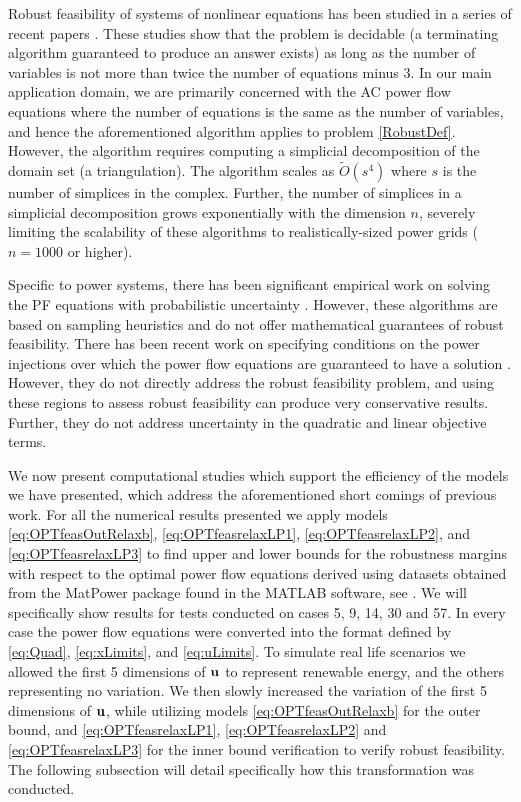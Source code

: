 
Robust feasibility of systems of nonlinear equations has been studied in a series of recent papers \cite{FrKr2015,FrKrWa2016}.
These studies show that the problem is decidable (a terminating algorithm guaranteed to produce an answer exists) as long as the number of variables is not more than twice the number of equations minus $3$.
In our main application domain, we are primarily concerned with the AC power flow equations
where the number of equations is the same as the number of variables, and hence the aforementioned algorithm \cite{FrKr2015,FrKrWa2016} applies to problem \ref{RobustDef}.
However, the algorithm requires computing a simplicial decomposition of the domain set (a triangulation).
The algorithm scales as $\tilde{O}(s^4)$ where $s$ is the number of simplices in the complex.
Further, the number of simplices in a simplicial decomposition grows exponentially with the dimension $n$, severely limiting the scalability of these algorithms to realistically-sized power grids ($n=1000$ or higher).

Specific to power systems, there has been significant empirical work on solving the PF equations with probabilistic uncertainty \cite{morales2007point,wang1992interval}.
However, these algorithms are based on sampling heuristics and do not offer mathematical guarantees of robust feasibility.
There has been recent work on specifying conditions on the power injections over which the power flow equations are guaranteed to have a solution \cite{bolognani2016existence,EPFLA,EPFLB}.
However, they do not directly address the robust feasibility problem, and using these regions to assess robust feasibility can produce very conservative results.
Further, they do not address uncertainty in the quadratic and linear objective terms.

We now present computational studies which support the efficiency of the models we have presented, which address the aforementioned short comings of previous work. 
For all the numerical results presented we apply models \eqref{eq:OPTfeasOutRelaxb}, \eqref{eq:OPTfeasrelaxLP1}, \eqref{eq:OPTfeasrelaxLP2}, and \eqref{eq:OPTfeasrelaxLP3} to find upper and lower bounds for the robustness margins with respect to the optimal power flow equations derived using datasets obtained from the MatPower package found in the MATLAB software, see \cite{matpower}. 
We will specifically show results for tests conducted on cases 5, 9, 14, 30 and 57. 
In every case the power flow equations were converted into the format defined by \eqref{eq:Quad}, \eqref{eq:xLimits}, and \eqref{eq:uLimits}. 
To simulate real life scenarios we allowed the first 5 dimensions of $\bold u$ to represent renewable energy, and the others representing no variation. We then slowly increased the variation of the first 5 dimensions of $\bold u$, while utilizing models \eqref{eq:OPTfeasOutRelaxb} for the outer bound, and \eqref{eq:OPTfeasrelaxLP1}, \eqref{eq:OPTfeasrelaxLP2} and \eqref{eq:OPTfeasrelaxLP3} for the inner bound verification to verify robust feasibility. 
The following subsection will detail specifically how this transformation was conducted.
